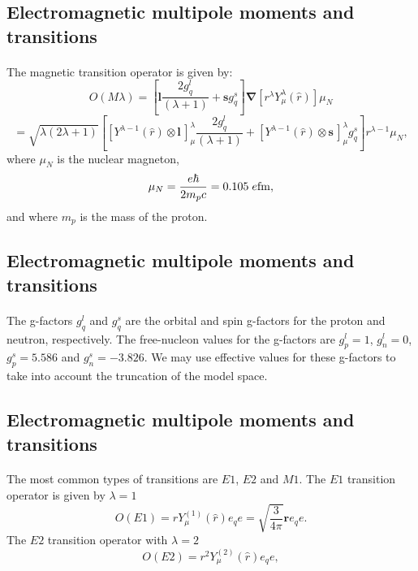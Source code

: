 \documentclass[%
oneside,                 %
final,                   %
10pt]{article}
\begin{document}
\subsection{Electromagnetic multipole moments and transitions}

\paragraph{}
The magnetic transition operator is given by:
\[
O(M\lambda)=\left[\mathbf{l}\frac{2g^{l }_{q}}{(\lambda +1)}+ \mathbf{s}g^{s}_{q}\right]\mathbf{\nabla}[r^{\lambda }Y^{\lambda }_{\mu }(\hat{r})]\mu _{N}
\]
\[
= \sqrt{\lambda (2\lambda +1)}\left[[Y^{\lambda -1}(\hat{r})\otimes \mathbf{l}\,]^{\lambda }_{\mu }\frac{2g^{l}_{q}}{(\lambda +1)}
+ [Y^{\lambda -1}(\hat{r})\otimes \mathbf{s}\,]^{\lambda }_{\mu }g^{s}_{q}\right]r^{\lambda -1}\mu _{N}, 
\]
 where $\mu_{N}$ is the nuclear magneton,
\[
\mu _{N}=\frac{e\hbar }{2m_{p}c} = 0.105 \; e {\rm fm}, 
\]
and where $m_{p}$ is the mass of the proton.



\subsection{Electromagnetic multipole moments and transitions}

\paragraph{}
The g-factors $g^{l}_{q}$ and $g^{s}_{q}$
are the orbital and spin g-factors
for the proton and neutron, respectively.
The
free-nucleon values for the g-factors are $g^{l}_{p}=1$, $g^{l}_{n}=0$,
$g^{s}_{p}=5.586$ and $g^{s}_{n}=-3.826$. We may use effective values
for these g-factors to take into account the truncation of the model
space.



\subsection{Electromagnetic multipole moments and transitions}

\paragraph{}
The most common types of transitions are $E1$, $E2$ and $M1$.
The $E1$ transition operator is given by $\lambda=1$
\[
O(E1) = rY^{(1)}_{\mu }(\hat{r})e_{q} e= \sqrt{\frac{3}{4\pi }}\mathbf{r}e_{q} e.
\]
The $E2$ transition operator with $\lambda=2$
\[
O(E2) = r^{2}Y^{(2)}_{\mu }(\hat{r})e_{q} e,  
\]
\end{document}
